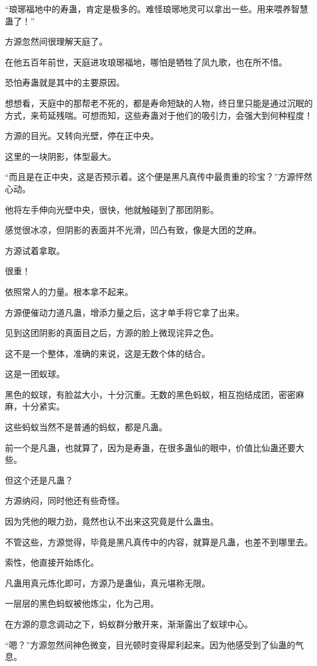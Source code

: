 \begin{this_body}
“琅琊福地中的寿蛊，肯定是极多的。难怪琅琊地灵可以拿出一些。用来喂养智慧蛊了！”

方源忽然间很理解天庭了。

在他五百年前世，天庭进攻琅琊福地，哪怕是牺牲了凤九歌，也在所不惜。

恐怕寿蛊就是其中的主要原因。

想想看，天庭中的那帮老不死的，都是寿命短缺的人物，终日里只能是通过沉眠的方式，来苟延残喘。可想而知，这些寿蛊对于他们的吸引力，会强大到何种程度！

方源的目光。又转向光壁，停在正中央。

这里的一块阴影，体型最大。

“而且是在正中央，这是否预示着。这个便是黑凡真传中最贵重的珍宝？”方源怦然心动。

他将左手伸向光壁中央，很快，他就触碰到了那团阴影。

感觉很冰凉，但阴影的表面并不光滑，凹凸有致，像是大团的芝麻。

方源试着拿取。

很重！

依照常人的力量。根本拿不起来。

方源便催动力道凡蛊，增添力量之后，这才单手将它拿了出来。

见到这团阴影的真面目之后，方源的脸上微现诧异之色。

这不是一个整体，准确的来说，这是无数个体的结合。

这是一团蚁球。

黑色的蚁球，有脸盆大小，十分沉重。无数的黑色蚂蚁，相互抱结成团，密密麻麻，十分紧实。

这些蚂蚁当然不是普通的蚂蚁，都是凡蛊。

前一个是凡蛊，也就算了，因为是寿蛊，在很多蛊仙的眼中，价值比仙蛊还要大些。

但这个还是凡蛊？

方源纳闷，同时他还有些奇怪。

因为凭他的眼力劲，竟然也认不出来这究竟是什么蛊虫。

不管这些，方源觉得，毕竟是黑凡真传中的内容，就算是凡蛊，也差不到哪里去。

索性，他直接开始炼化。

凡蛊用真元炼化即可，方源乃是蛊仙，真元堪称无限。

一层层的黑色蚂蚁被他炼尘，化为己用。

在方源的意念调动之下，蚂蚁群分散开来，渐渐露出了蚁球中心。

“嗯？”方源忽然间神色微变，目光顿时变得犀利起来。因为他感受到了仙蛊的气息。


\end{this_body}
